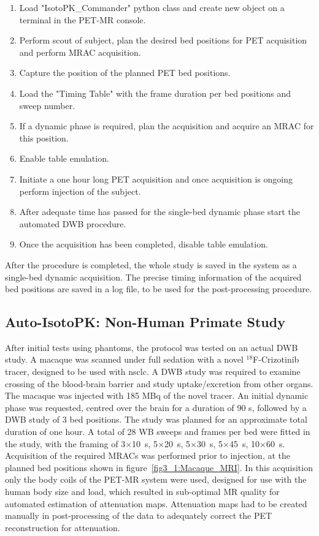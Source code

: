 \begin{enumerate}
    \item Load "IsotoPK\_Commander" python class and create new object on a terminal in the PET-MR console. 
    \item Perform scout of subject, plan the desired bed positions for PET acquisition and perform MRAC acquisition. 
    \item Capture the position of the planned PET bed positions.
    \item Load the "Timing Table" with the frame duration per bed positions and sweep number.
    \item If a dynamic phase is required, plan the acquisition and acquire an MRAC for this position. 
    \item Enable table emulation. 
    \item Initiate a one hour long PET acquisition and once acquisition is ongoing perform injection of the subject. 
    \item After adequate time has passed for the single-bed dynamic phase start the automated DWB procedure. 
    \item Once the acquisition has been completed, disable table emulation. 
\end{enumerate}

After the procedure is completed, the whole study is saved in the system as a single-bed dynamic acquisition. The precise timing information of the acquired bed positions are saved in a log file, to be used for the post-processing procedure. 

\subsection{Auto-IsotoPK: Non-Human Primate Study}
After initial tests using phantoms, the protocol was tested on an actual DWB study. A macaque was scanned under full sedation with a novel $^{18}$F-Crizotinib tracer, designed to be used with \gls{nsclc}. A DWB study was required to examine crossing of the blood-brain barrier and study uptake/excretion from other organs. The macaque was injected with 185 \si{\mega \becquerel} of the novel tracer. An initial dynamic phase was requested, centred over the brain for a duration of 90 s, followed by a DWB study of 3 bed positions. The study was planned for an approximate total duration of one hour. A total of 28 WB sweeps and frames per bed were fitted in the study, with the framing of 3$\times$10~\si{\s}, 5$\times$20~\si{\s}, 5$\times$30~\si{\s}, 5$\times$45~\si{\s}, 10$\times$60~\si{\s}. 
Acquisition of the required MRACs was performed prior to injection, at the planned bed positions shown in figure~\ref{fig3_1:Macaque_MRI}. In this acquisition only the body coils of the PET-MR system were used, designed for use with the human body size and load, which resulted in sub-optimal MR quality for automated estimation of attenuation maps. Attenuation maps had to be created manually in post-processing of the data to adequately correct the PET reconstruction for attenuation.  

